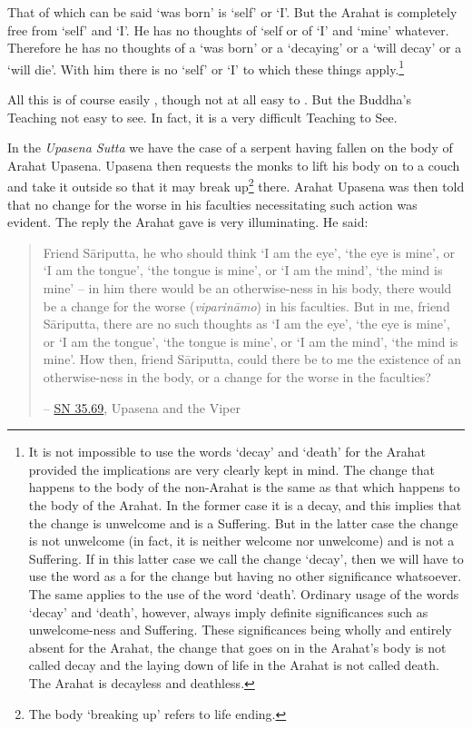 That of which can be said `was born' is `self' or `I'. But the Arahat is completely free from `self' and `I'. He has no thoughts of `self or of `I' and `mine' whatever. Therefore he has no thoughts of a `was born' or a `decaying' or a `will decay' or a `will die'. With him there is no `self' or `I' to which  these things apply.\footnote{It is not impossible to use the words `decay' and `death' for the Arahat provided the implications are very clearly kept in mind. The change that happens to the body of the non-Arahat is the same as that which happens to the body of the Arahat. In the former case it is a decay, and this implies that the change is unwelcome and is a Suffering. But in the latter case the change is not unwelcome (in fact, it is neither welcome nor unwelcome) and is not a Suffering. If in this latter case we call the change `decay', then we will have to use the word  as a  for the change but having no other significance whatsoever. The same applies to the use of the word `death'. Ordinary usage of the words `decay' and `death', however, always imply definite significances such as unwelcome-ness and Suffering. These significances being wholly and entirely absent for the Arahat, the change that goes on in the Arahat's body is not called decay and the laying down of life in the Arahat is not called death. The Arahat is decayless and deathless.}

All this is of course easily , though not at all easy to . But the Buddha's Teaching  not easy to see. In fact, it is a very difficult Teaching to See.

In the \emph{Upasena Sutta} we have the case of a serpent having fallen on the body of Arahat Upasena. Upasena then requests the monks to lift his body on to a couch and take it outside so that it may break up\footnote{The body `breaking up' refers to life ending.} there. Arahat Upasena was then told that no change for the worse in his faculties necessitating such action was evident. The reply the Arahat gave is very illuminating. He said:

\begin{quote}
Friend Sāriputta, he who should think `I am the eye', `the eye is mine', or `I am the tongue', `the tongue is mine', or `I am the mind', `the mind is mine' -- in him there would be an otherwise-ness in his body, there would be a change for the worse (\emph{viparināmo}) in his faculties. But in me, friend Sāriputta, there are no such thoughts as `I am the eye', `the eye is mine', or `I am the tongue', `the tongue is mine', or `I am the mind', `the mind is mine'. How then, friend Sāriputta, could there be to me the existence of an otherwise-ness in the body, or a change for the worse in the faculties?

 -- \href{https://suttacentral.net/sn35.69/en/sujato}{SN 35.69}, Upasena and the Viper
\end{quote}

